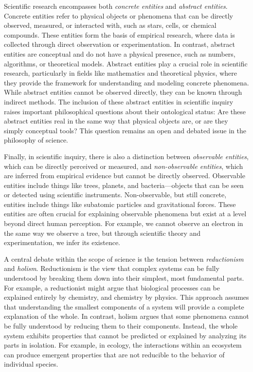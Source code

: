 Scientific research encompasses both \emph{concrete entities} and \emph{abstract entities}. Concrete entities refer to physical objects or phenomena that can be directly observed, measured, or interacted with, such as stars, cells, or chemical compounds. These entities form the basis of empirical research, where data is collected through direct observation or experimentation. In contrast, abstract entities are conceptual and do not have a physical presence, such as numbers, algorithms, or theoretical models. Abstract entities play a crucial role in scientific research, particularly in fields like mathematics and theoretical physics, where they provide the framework for understanding and modeling concrete phenomena. While abstract entities cannot be observed directly, they can be known through indirect methods. The inclusion of these abstract entities in scientific inquiry raises important philosophical questions about their ontological status: Are these abstract entities real in the same way that physical objects are, or are they simply conceptual tools? This question remains an open and debated issue in the philosophy of science.

Finally, in scientific inquiry, there is also a distinction between \emph{observable entities}, which can be directly perceived or measured, and \emph{non-observable entities}, which are inferred from empirical evidence but cannot be directly observed. Observable entities include things like trees, planets, and bacteria—objects that can be seen or detected using scientific instruments. Non-observable, but still concrete, entities include things like subatomic particles and gravitational forces. These entities are often crucial for explaining observable phenomena but exist at a level beyond direct human perception. For example, we cannot observe an electron in the same way we observe a tree, but through scientific theory and experimentation, we infer its existence.

A central debate within the scope of science is the tension between \emph{reductionism} and \emph{holism}. Reductionism is the view that complex systems can be fully understood by breaking them down into their simplest, most fundamental parts. For example, a reductionist might argue that biological processes can be explained entirely by chemistry, and chemistry by physics. This approach assumes that understanding the smallest components of a system will provide a complete explanation of the whole. In contrast, holism argues that some phenomena cannot be fully understood by reducing them to their components. Instead, the whole system exhibits properties that cannot be predicted or explained by analyzing its parts in isolation. For example, in ecology, the interactions within an ecosystem can produce emergent properties that are not reducible to the behavior of individual species.

